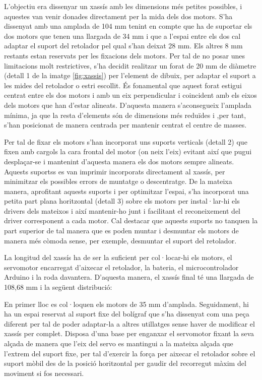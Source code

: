 L’objectiu era dissenyar un xassís amb les dimensions més petites possibles, i aquestes van venir donades directament per la mida dels dos motors. S’ha dissenyat  amb una amplada de 104 mm tenint en compte que ha de suportar els dos motors que tenen una llargada de 34 mm i que a l’espai entre els dos cal adaptar el suport del retolador pel qual s'han deixat 28 mm. Els altres 8 mm restants estan reservats per les fixacions dels motors. Per tal de no posar unes limitacions molt restrictives, s’ha decidit realitzar un forat de 20 mm de diàmetre (detall 1 de la imatge \ref{fig:xassis}) per l’element de dibuix, per  adaptar el suport a les mides del retolador o estri escollit. És fonamental que aquest forat estigui centrat entre els dos motors i amb un eix perpendicular i coincident amb els eixos dels motors que han d’estar alineats. D’aquesta manera s’aconsegueix l’amplada mínima, ja que la resta d’elements són de dimensions més reduïdes i ,per tant, s’han posicionat de manera centrada per mantenir centrat el centre de masses. 

Per tal de fixar els motors s’han incorporat uns suports verticals (detall 2) que fixen amb cargols la cara frontal del motor (on neix l’eix) evitant així que pugui desplaçar-se i mantenint d’aquesta manera els dos motors sempre alineats. Aquests suportss es van imprimir incorporats directament al xassís, per minimitzar els possibles errors de muntatge o descentratge. De la mateixa manera, aprofitant aquests suports i per optimitzar l’espai, s’ha incorporat una petita part plana horitzontal (detall 3) sobre els motors per instal·lar-hi els drivers dels mateixos i així mantenir-ho junt i facilitant el reconeixement del driver corresponent a cada motor. Cal destacar que aquests suports no tanquen la part superior de tal manera que es poden muntar i desmuntar els motors de manera més còmoda sense, per exemple, desmuntar el suport del retolador. 

La longitud del xassís ha de ser la suficient per col·locar-hi els motors, el servomotor encarregat d’aixecar el retolador, la bateria, el microcontrolador Arduino i la roda davantera. D’aquesta manera, el xassís final té una llargada de 108,68 mm i la següent distribució: 

En primer lloc es col·loquen els motors de 35 mm d'amplada. Seguidament, hi ha un espai reservat al suport fixe del bolígraf que s’ha dissenyat com una peça diferent per tal de poder adaptar-la a altres utillatges sense haver de modificar el xassís per complet. Disposa d’una base per enganxar el servomotor fixant la seva alçada de manera que l’eix del servo es mantingui a la mateixa alçada que l’extrem del suport fixe, per tal d’exercir la força per aixecar el retolador sobre el suport mòbil des de la posició horitzontal per gaudir del recorregut màxim del moviment si fos necessari. 

